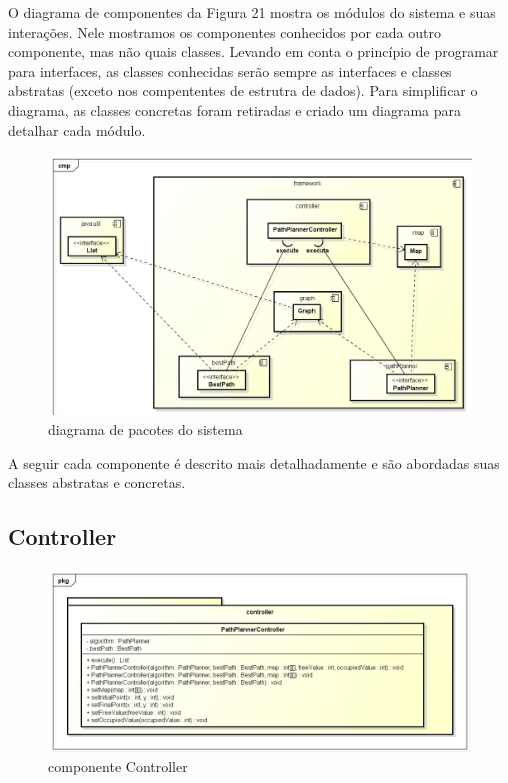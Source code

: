 O diagrama de componentes da Figura 21 mostra os módulos do sistema e suas interações. Nele mostramos os componentes conhecidos por cada outro componente, mas não quais classes. Levando em conta o princípio de programar para interfaces, as classes conhecidas serão sempre as interfaces e classes abstratas (exceto nos compententes de estrutra de dados). Para simplificar o diagrama, as classes concretas foram retiradas e criado um diagrama para detalhar cada módulo.

\begin{figure}[h]
	\centering
	\label{fig21}
		\includegraphics[keepaspectratio=true,scale=0.4]{figuras/componentes.png}
	\caption{diagrama de pacotes do sistema}
\end{figure}

A seguir cada componente é descrito mais detalhadamente e são abordadas suas classes abstratas e concretas.

\subsection{Controller}

\begin{figure}[h]
	\centering
	\label{fig22}
		\includegraphics[keepaspectratio=true,scale=0.5]{figuras/pkgcontroller.png}
	\caption{componente Controller}
\end{figure}

